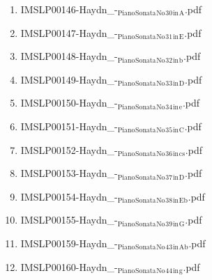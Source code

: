 \documentclass[11pt]{article}
\begin{document}
\begin{enumerate}
\begin{enumerate}
\item IMSLP00146-Haydn\_-$_{\text{Piano}}$$_{\text{Sonata}}$$_{\text{No}}$$_{\text{30}}$$_{\text{in}}$$_{\text{A}}$.pdf
\label{sec-1-1-1-1-44-38-4-28}

\item IMSLP00147-Haydn\_-$_{\text{Piano}}$$_{\text{Sonata}}$$_{\text{No}}$$_{\text{31}}$$_{\text{in}}$$_{\text{E}}$.pdf
\label{sec-1-1-1-1-44-38-4-29}

\item IMSLP00148-Haydn\_-$_{\text{Piano}}$$_{\text{Sonata}}$$_{\text{No}}$$_{\text{32}}$$_{\text{in}}$$_{\text{b}}$.pdf
\label{sec-1-1-1-1-44-38-4-30}

\item IMSLP00149-Haydn\_-$_{\text{Piano}}$$_{\text{Sonata}}$$_{\text{No}}$$_{\text{33}}$$_{\text{in}}$$_{\text{D}}$.pdf
\label{sec-1-1-1-1-44-38-4-31}

\item IMSLP00150-Haydn\_-$_{\text{Piano}}$$_{\text{Sonata}}$$_{\text{No}}$$_{\text{34}}$$_{\text{in}}$$_{\text{e}}$.pdf
\label{sec-1-1-1-1-44-38-4-32}

\item IMSLP00151-Haydn\_-$_{\text{Piano}}$$_{\text{Sonata}}$$_{\text{No}}$$_{\text{35}}$$_{\text{in}}$$_{\text{C}}$.pdf
\label{sec-1-1-1-1-44-38-4-33}

\item IMSLP00152-Haydn\_-$_{\text{Piano}}$$_{\text{Sonata}}$$_{\text{No}}$$_{\text{36}}$$_{\text{in}}$$_{\text{cs}}$.pdf
\label{sec-1-1-1-1-44-38-4-34}

\item IMSLP00153-Haydn\_-$_{\text{Piano}}$$_{\text{Sonata}}$$_{\text{No}}$$_{\text{37}}$$_{\text{in}}$$_{\text{D}}$.pdf
\label{sec-1-1-1-1-44-38-4-35}

\item IMSLP00154-Haydn\_-$_{\text{Piano}}$$_{\text{Sonata}}$$_{\text{No}}$$_{\text{38}}$$_{\text{in}}$$_{\text{Eb}}$.pdf
\label{sec-1-1-1-1-44-38-4-36}

\item IMSLP00155-Haydn\_-$_{\text{Piano}}$$_{\text{Sonata}}$$_{\text{No}}$$_{\text{39}}$$_{\text{in}}$$_{\text{G}}$.pdf
\label{sec-1-1-1-1-44-38-4-37}

\item IMSLP00159-Haydn\_-$_{\text{Piano}}$$_{\text{Sonata}}$$_{\text{No}}$$_{\text{43}}$$_{\text{in}}$$_{\text{Ab}}$.pdf
\label{sec-1-1-1-1-44-38-4-38}

\item IMSLP00160-Haydn\_-$_{\text{Piano}}$$_{\text{Sonata}}$$_{\text{No}}$$_{\text{44}}$$_{\text{in}}$$_{\text{g}}$.pdf
\label{sec-1-1-1-1-44-38-4-39}


\end{enumerate}
\end{enumerate}
\end{document}
